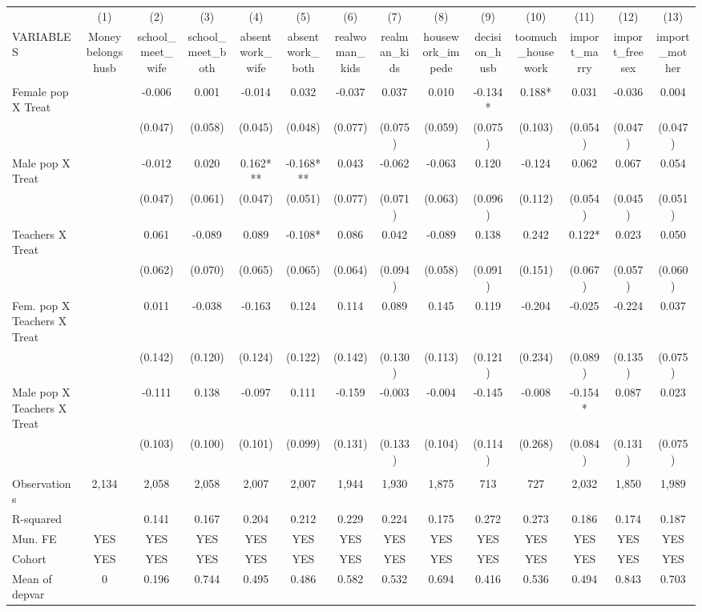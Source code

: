 \begin{tabular}{lccccccccccccc} \hline
 & (1) & (2) & (3) & (4) & (5) & (6) & (7) & (8) & (9) & (10) & (11) & (12) & (13) \\
VARIABLES & Money belongs husb & school\_meet\_wife & school\_meet\_both & absentwork\_wife & absentwork\_both & realwoman\_kids & realman\_kids & housework\_impede & decision\_husb & toomuch\_housework & import\_marry & import\_freesex & import\_mother \\ \hline
 &  &  &  &  &  &  &  &  &  &  &  &  &  \\
Female pop X Treat &  & -0.006 & 0.001 & -0.014 & 0.032 & -0.037 & 0.037 & 0.010 & -0.134* & 0.188* & 0.031 & -0.036 & 0.004 \\
 &  & (0.047) & (0.058) & (0.045) & (0.048) & (0.077) & (0.075) & (0.059) & (0.075) & (0.103) & (0.054) & (0.047) & (0.047) \\
Male pop X Treat &  & -0.012 & 0.020 & 0.162*** & -0.168*** & 0.043 & -0.062 & -0.063 & 0.120 & -0.124 & 0.062 & 0.067 & 0.054 \\
 &  & (0.047) & (0.061) & (0.047) & (0.051) & (0.077) & (0.071) & (0.063) & (0.096) & (0.112) & (0.054) & (0.045) & (0.051) \\
Teachers X Treat &  & 0.061 & -0.089 & 0.089 & -0.108* & 0.086 & 0.042 & -0.089 & 0.138 & 0.242 & 0.122* & 0.023 & 0.050 \\
 &  & (0.062) & (0.070) & (0.065) & (0.065) & (0.064) & (0.094) & (0.058) & (0.091) & (0.151) & (0.067) & (0.057) & (0.060) \\
Fem. pop X Teachers X Treat &  & 0.011 & -0.038 & -0.163 & 0.124 & 0.114 & 0.089 & 0.145 & 0.119 & -0.204 & -0.025 & -0.224 & 0.037 \\
 &  & (0.142) & (0.120) & (0.124) & (0.122) & (0.142) & (0.130) & (0.113) & (0.121) & (0.234) & (0.089) & (0.135) & (0.075) \\
Male pop X Teachers X Treat &  & -0.111 & 0.138 & -0.097 & 0.111 & -0.159 & -0.003 & -0.004 & -0.145 & -0.008 & -0.154* & 0.087 & 0.023 \\
 &  & (0.103) & (0.100) & (0.101) & (0.099) & (0.131) & (0.133) & (0.104) & (0.114) & (0.268) & (0.084) & (0.131) & (0.075) \\
 &  &  &  &  &  &  &  &  &  &  &  &  &  \\
Observations & 2,134 & 2,058 & 2,058 & 2,007 & 2,007 & 1,944 & 1,930 & 1,875 & 713 & 727 & 2,032 & 1,850 & 1,989 \\
R-squared &  & 0.141 & 0.167 & 0.204 & 0.212 & 0.229 & 0.224 & 0.175 & 0.272 & 0.273 & 0.186 & 0.174 & 0.187 \\
Mun. FE & YES & YES & YES & YES & YES & YES & YES & YES & YES & YES & YES & YES & YES \\
Cohort & YES & YES & YES & YES & YES & YES & YES & YES & YES & YES & YES & YES & YES \\
 Mean of depvar & 0 & 0.196 & 0.744 & 0.495 & 0.486 & 0.582 & 0.532 & 0.694 & 0.416 & 0.536 & 0.494 & 0.843 & 0.703 \\ \hline
\end{tabular}
